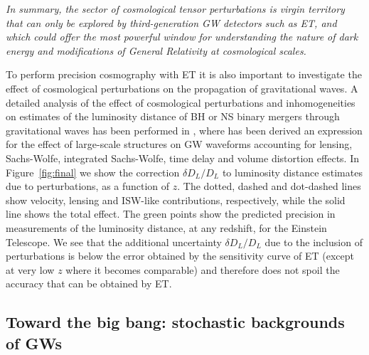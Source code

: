 {\em In summary, the sector of cosmological tensor perturbations is  virgin territory that can only be explored by third-generation GW detectors such as ET, and which could  offer the most powerful window for understanding the nature of dark energy and modifications of General Relativity at cosmological scales.}



To perform precision cosmography with ET it is also important to investigate 
the effect of cosmological perturbations on the propagation of gravitational waves. 
A detailed analysis  of  the effect of cosmological perturbations and inhomogeneities on estimates of the luminosity distance of BH or NS binary mergers through gravitational waves has been performed
in \cite{Bertacca:2017vod}, where has been  derived an expression 
for the effect of large-scale structures on GW waveforms accounting for lensing, Sachs-Wolfe, integrated Sachs-Wolfe, time delay and volume distortion effects. In Figure~\ref{fig:final} we show the correction  $\delta D_L /D_L$ to luminosity distance estimates due to perturbations, as a function of $z$. The dotted, dashed and dot-dashed lines show velocity, lensing and ISW-like contributions, respectively, while the solid line shows the total effect. The
green points show the predicted precision in measurements of the luminosity distance, at any redshift, for the Einstein Telescope. We see that the additional  uncertainty $\delta D_L/D_L$ due to the inclusion of perturbations is below the error obtained by the sensitivity curve of ET (except at very low $z$ where it becomes comparable) and therefore does not spoil the accuracy that can be obtained by ET.




\subsection{Toward the big bang: stochastic backgrounds of GWs}


